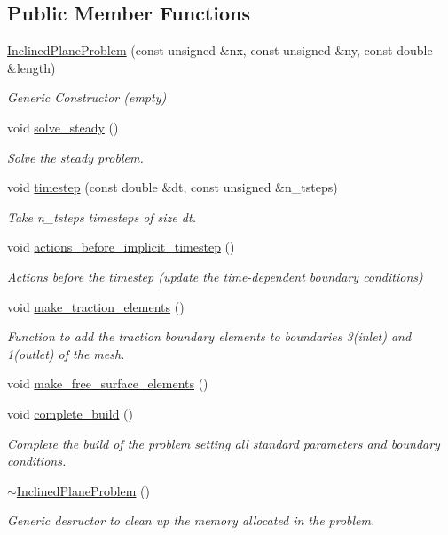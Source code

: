 \subsection*{Public Member Functions}
\begin{DoxyCompactItemize}
\item 
\hyperlink{classInclinedPlaneProblem_a52d15d242c8f17a340914996b49a32a3}{Inclined\+Plane\+Problem} (const unsigned \&nx, const unsigned \&ny, const double \&length)
\begin{DoxyCompactList}\small\item\em Generic Constructor (empty) \end{DoxyCompactList}\item 
void \hyperlink{classInclinedPlaneProblem_a0e2fcfdb8230df82729ba7d728e58040}{solve\+\_\+steady} ()
\begin{DoxyCompactList}\small\item\em Solve the steady problem. \end{DoxyCompactList}\item 
void \hyperlink{classInclinedPlaneProblem_a74bbd1ccfd3dd82c999a16924c230f51}{timestep} (const double \&dt, const unsigned \&n\+\_\+tsteps)
\begin{DoxyCompactList}\small\item\em Take n\+\_\+tsteps timesteps of size dt. \end{DoxyCompactList}\item 
void \hyperlink{classInclinedPlaneProblem_af9cf7a9677e823c52f1646105dfa7937}{actions\+\_\+before\+\_\+implicit\+\_\+timestep} ()
\begin{DoxyCompactList}\small\item\em Actions before the timestep (update the time-\/dependent boundary conditions) \end{DoxyCompactList}\item 
void \hyperlink{classInclinedPlaneProblem_a39ab8005f7603bd1f06f13d6e7a3ae64}{make\+\_\+traction\+\_\+elements} ()
\begin{DoxyCompactList}\small\item\em Function to add the traction boundary elements to boundaries 3(inlet) and 1(outlet) of the mesh. \end{DoxyCompactList}\item 
void \hyperlink{classInclinedPlaneProblem_a78d06d406af81a3dddbec0a31b65e8a4}{make\+\_\+free\+\_\+surface\+\_\+elements} ()
\item 
void \hyperlink{classInclinedPlaneProblem_ae44e360be4a46e1343c3960c3a43380f}{complete\+\_\+build} ()
\begin{DoxyCompactList}\small\item\em Complete the build of the problem setting all standard parameters and boundary conditions. \end{DoxyCompactList}\item 
\hyperlink{classInclinedPlaneProblem_ad89c7dc7975bf128a7c249496fabc97f}{$\sim$\+Inclined\+Plane\+Problem} ()
\begin{DoxyCompactList}\small\item\em Generic desructor to clean up the memory allocated in the problem. \end{DoxyCompactList}\end{DoxyCompactItemize}
